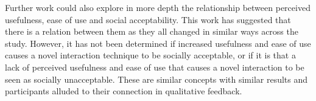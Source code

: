 \documentclass{l4proj}
\begin{document}
Further work could also explore in more depth the relationship between perceived usefulness, ease of use and social acceptability. This work has suggested that there is a relation between them as they all changed in similar ways across the study. However, it has not been determined if increased usefulness and ease of use causes a novel interaction technique to be socially acceptable, or if it is that a lack of perceived usefulness and ease of use that causes a novel interaction to be seen as socially unacceptable. These are similar concepts with similar results and participants alluded to their connection in qualitative feedback.

\begin{appendices}


\end{appendices}
\end{document}
